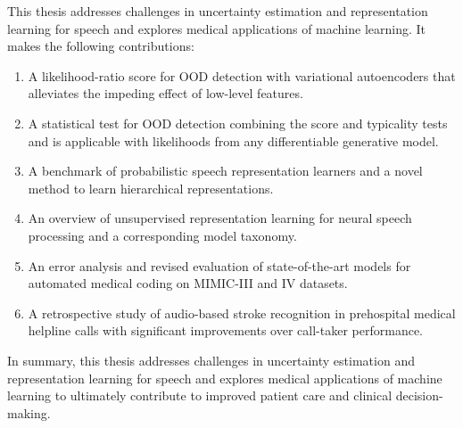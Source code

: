 This thesis addresses challenges in uncertainty estimation and representation learning for speech and explores medical applications of machine learning. It makes the following contributions:
%
\begin{enumerate}[topsep=3pt, partopsep=0pt, itemsep=3pt, parsep=0pt, leftmargin=2em, label=(\alph*)] %
    \item A likelihood-ratio score for OOD detection with variational autoencoders that alleviates the impeding effect of low-level features.
    \item A statistical test for OOD detection combining the score and typicality tests and is applicable with likelihoods from any differentiable generative model.
    \item A benchmark of probabilistic speech representation learners and a novel method to learn hierarchical representations.
    \item An overview of unsupervised representation learning for neural speech processing and a corresponding model taxonomy.
    \item An error analysis and revised evaluation of state-of-the-art models for automated medical coding on MIMIC-III and IV datasets. 
    \item A retrospective study of audio-based stroke recognition in prehospital medical helpline calls with significant improvements over call-taker performance.
\end{enumerate}
%
In summary, this thesis addresses challenges in uncertainty estimation and representation learning for speech and explores medical applications of machine learning to ultimately contribute to improved patient care and clinical decision-making.



